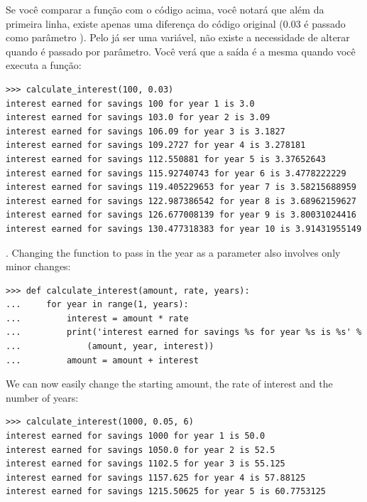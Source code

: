 Se você comparar a função com o código acima, você notará que além da primeira linha, existe apenas uma diferença do código original (0.03 é passado como parâmetro ). Pelo  já ser uma variável, não existe a necessidade de alterar quando é passado por parâmetro. Você verá que a saída é a mesma quando você executa a função:

\begin{listing}
\begin{verbatim}
>>> calculate_interest(100, 0.03)
interest earned for savings 100 for year 1 is 3.0
interest earned for savings 103.0 for year 2 is 3.09
interest earned for savings 106.09 for year 3 is 3.1827
interest earned for savings 109.2727 for year 4 is 3.278181
interest earned for savings 112.550881 for year 5 is 3.37652643
interest earned for savings 115.92740743 for year 6 is 3.4778222229
interest earned for savings 119.405229653 for year 7 is 3.58215688959
interest earned for savings 122.987386542 for year 8 is 3.68962159627
interest earned for savings 126.677008139 for year 9 is 3.80031024416
interest earned for savings 130.477318383 for year 10 is 3.91431955149
\end{verbatim}
\end{listing}

. Changing the function to pass in the year as a parameter also involves only minor changes:

\begin{listing}
\begin{verbatim}
>>> def calculate_interest(amount, rate, years):
...     for year in range(1, years):
...         interest = amount * rate
...         print('interest earned for savings %s for year %s is %s' %
...             (amount, year, interest))
...         amount = amount + interest
\end{verbatim}
\end{listing}

\noindent
We can now easily change the starting amount, the rate of interest and the number of years:

\begin{listing}
\begin{verbatim}
>>> calculate_interest(1000, 0.05, 6)
interest earned for savings 1000 for year 1 is 50.0
interest earned for savings 1050.0 for year 2 is 52.5
interest earned for savings 1102.5 for year 3 is 55.125
interest earned for savings 1157.625 for year 4 is 57.88125
interest earned for savings 1215.50625 for year 5 is 60.7753125
\end{verbatim}
\end{listing}

